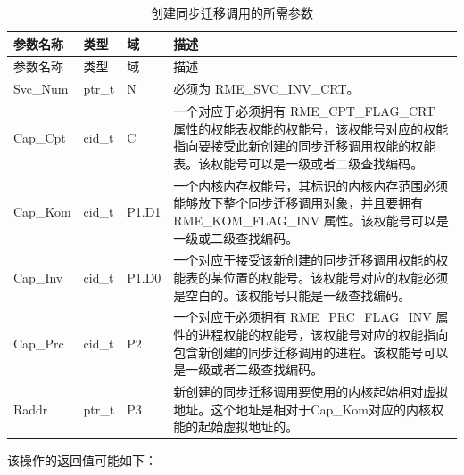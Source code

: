 \begin{xltabular}{\textwidth}{@{}>{\hsize\raggedright\arraybackslash}X>{\hsize\raggedright\arraybackslash}X>{\hsize\raggedright\arraybackslash}X>{\hsize\raggedright\arraybackslash}X@{}}
\caption{创建同步迁移调用的所需参数}\label{tab:5-4-create-sync-invocation-parameters}\\
\toprule
参数名称 & 类型 & 域 & 描述\tabularnewline
\endfirsthead
\toprule
参数名称 & 类型 & 域 & 描述\tabularnewline
\midrule
\endhead
\bottomrule
\endlastfoot
Svc\_Num & ptr\_t & N & 必须为 RME\_SVC\_INV\_CRT。\tabularnewline
Cap\_Cpt & cid\_t & C &
一个对应于必须拥有 RME\_CPT\_FLAG\_CRT 属性的权能表权能的权能号，该权能号对应的权能指向要接受此新创建的同步迁移调用权能的权能表。该权能号可以是一级或者二级查找编码。\tabularnewline
Cap\_Kom & cid\_t & P1.D1 &
一个内核内存权能号，其标识的内核内存范围必须能够放下整个同步迁移调用对象，并且要拥有 RME\_KOM\_FLAG\_INV 属性。该权能号可以是一级或二级查找编码。\tabularnewline
Cap\_Inv & cid\_t & P1.D0 &
一个对应于接受该新创建的同步迁移调用权能的权能表的某位置的权能号。该权能号对应的权能必须是空白的。该权能号只能是一级查找编码。\tabularnewline
Cap\_Prc & cid\_t & P2 &
一个对应于必须拥有 RME\_PRC\_FLAG\_INV 属性的进程权能的权能号，该权能号对应的权能指向包含新创建的同步迁移调用的进程。该权能号可以是一级或者二级查找编码。\tabularnewline
Raddr & ptr\_t & P3 &
新创建的同步迁移调用要使用的内核起始相对虚拟地址。这个地址是相对于Cap\_Kom对应的内核权能的起始虚拟地址的。\tabularnewline
\end{xltabular}

该操作的返回值可能如下：

